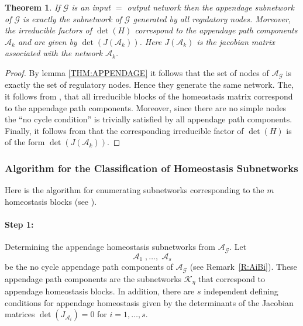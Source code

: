 \documentclass[pdflatex,sn-basic,Numbered]{sn-jnl}
\renewcommand{\AA}{{\mathcal A}}
\newcommand{\GG}{{\mathcal G}}
\newcommand{\KK}{{\mathcal K}}
\theoremstyle{thmstyleone}%
\newtheorem{theorem}{Theorem}[section]
\numberwithin{equation}{section}
\begin{document}
\begin{theorem} \label{THM:APPENDAGE_NET}
If $\mathcal{G}$ is an input $=$ output network then the appendage subnetwork of $\mathcal{G}$ is exactly the subnetwork of $\mathcal{G}$ generated by all regulatory nodes.
Moreover, the irreducible factors of $\det(H)$ correspond to the appendage path components $\mathcal{A}_k$ and are given by $\det(J({\mathcal{A}_k}))$. 
Here $J({\mathcal{A}_k})$ is the jacobian matrix associated with the network $\mathcal{A}_k$.
\end{theorem}
\begin{proof}
By lemma \ref{THM:APPENDAGE} it follows that the set of nodes of $\mathcal{A}_\mathcal{G}$ is exactly the set of regulatory nodes. Hence they generate the same network.
The, it follows from \cite[Thm. 7.1]{WHAG21}, that all irreducible blocks of the homeostasis matrix correspond to the appendage path components. Moreover, since there are no simple nodes the ``no cycle condition'' is trivially satisfied by all appendage path components.
Finally, it follows from \cite[Thm. 5.4]{WHAG21} that the corresponding irreducible factor of $\det(H)$ is of the form $\det(J({\mathcal{A}_k}))$.
\end{proof}




\subsubsection{Algorithm for the Classification of Homeostasis Subnetworks} 
\label{sec:algorithm}

Here is the algorithm for enumerating subnetworks corresponding to the $m$ homeostasis blocks (see \cite{WHAG21}).

\paragraph{Step 1:} Determining the appendage homeostasis subnetworks from $\AA_\GG$.  
Let 
\begin{equation} \label{e:AHB}
\AA_1\;,\ldots,\;\AA_s
\end{equation}
be the no cycle appendage path components of $\AA_\GG$ (see Remark~\ref{R:AiBi}). 
These appendage path components are the subnetworks $\KK_\eta$ that correspond to appendage homeostasis blocks. 
In addition, there are $s$ independent defining conditions for appendage homeostasis given by the determinants of the Jacobian matrices $\det(J_{\AA_i}) = 0$ for $i = 1,\ldots, s$.
\end{document}
